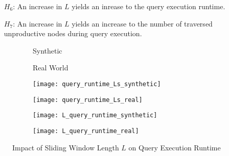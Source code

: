 \documentclass[abstracton,12pt]{scrartcl}
\theoremstyle{definition}
\begin{document}
\begin{shaded}
  \begin{itemize}
  \item[$H_6$:] An increase in $L$ yields an inrease to the query execution runtime. 
  \item[$H_7$:] An increase in $L$ yields an increase to the number of
    traversed unproductive nodes during query execution.
  \end{itemize}
\end{shaded}

\begin{figure}[h]
  \centering
  \begin{subfigure}{0.49\linewidth}
    \centering
    Synthetic
  \end{subfigure}
  \begin{subfigure}{0.49\linewidth}
    \centering
    Real World
  \end{subfigure}
  \begin{subfigure}{0.49\linewidth}
    \centering
    \texttt{[image: query\_runtime\_Ls\_synthetic]}
    \caption{}
    \label{fig:query_runtime_Ls_synthetic}
  \end{subfigure}
  \begin{subfigure}{0.49\linewidth}
    \centering
    \texttt{[image: query\_runtime\_Ls\_real]}
    \caption{}
    \label{fig:query_runtime_Ls_real}
  \end{subfigure}
  \begin{subfigure}{0.49\linewidth}
    \centering
    \texttt{[image: L\_query\_runtime\_synthetic]}
    \caption{}
    \label{fig:L_query_runtime_synthetic}
  \end{subfigure}
  \begin{subfigure}{0.49\linewidth}
    \centering
    \texttt{[image: L\_query\_runtime\_real]}
    \caption{}
    \label{fig:L_query_runtime_real}
  \end{subfigure}
  \caption{Impact of Sliding Window Length $L$ on Query Execution Runtime}
\end{figure}
\end{document}

